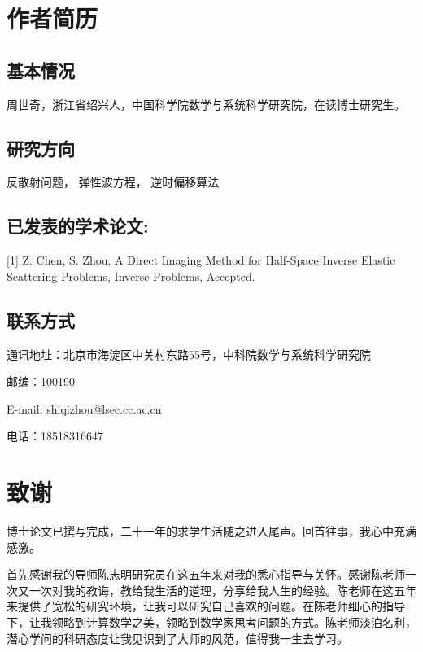 \chapter{作者简历}



\section*{基本情况}


周世奇，浙江省绍兴人，中国科学院数学与系统科学研究院，在读博士研究生。

\section*{研究方向}

反散射问题， 弹性波方程， 逆时偏移算法


\section*{已发表的学术论文:}

[1] Z. Chen, S. Zhou. A Direct Imaging Method for Half-Space Inverse
Elastic Scattering Problems, Inverse Problems, Accepted.

\section*{联系方式}

通讯地址：北京市海淀区中关村东路55号，中科院数学与系统科学研究院

邮编：100190

E-mail: shiqizhou@lsec.cc.ac.cn

电话：18518316647

\chapter[致谢]{致\quad 谢}%
\thispagestyle{noheaderstyle}%
博士论文已撰写完成，二十一年的求学生活随之进入尾声。回首往事，我心中充满感激。%

首先感谢我的导师陈志明研究员在这五年来对我的悉心指导与关怀。感谢陈老师一次又一次对我的教诲，教给我生活的道理，分享给我人生的经验。陈老师在这五年来提供了宽松的研究环境，让我可以研究自己喜欢的问题。在陈老师细心的指导下，让我领略到计算数学之美，领略到数学家思考问题的方式。陈老师淡泊名利，潜心学问的科研态度让我见识到了大师的风范，值得我一生去学习。

